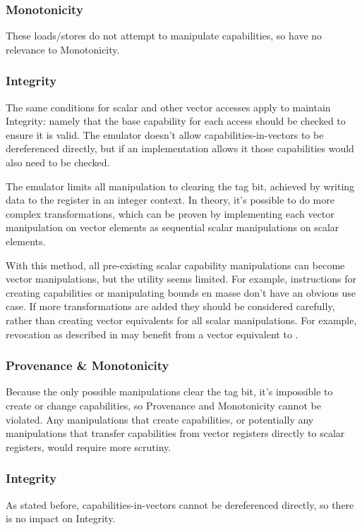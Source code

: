\subsubsection*{Monotonicity}
These loads/stores do not attempt to manipulate capabilities, so have no relevance to Monotonicity.

\subsubsection*{Integrity}
The same conditions for scalar and other vector accesses apply to maintain Integrity: namely that the base capability for each access should be checked to ensure it is valid.
The emulator doesn't allow capabilities-in-vectors to be dereferenced directly, but if an implementation allows it those capabilities would also need to be checked.

\pagebreak
{}
The emulator limits all manipulation to clearing the tag bit, achieved by writing data to the register in an integer context.
In theory, it's possible to do more complex transformations, which can be proven by implementing each vector manipulation on vector elements as sequential scalar manipulations on scalar elements.

With this method, all pre-existing scalar capability manipulations can become vector manipulations, but the utility seems limited.
For example, instructions for creating capabilities or manipulating bounds en masse don't have an obvious use case.
If more transformations are added they should be considered carefully, rather than creating vector equivalents for all scalar manipulations.
For example, revocation as described in \cite{xiaCHERIvokeCharacterisingPointer2019} may benefit from a vector equivalent to .

\subsubsection*{Provenance \& Monotonicity}
Because the only possible manipulations clear the tag bit, it's impossible to create or change capabilities, so Provenance and Monotonicity cannot be violated.
Any manipulations that create capabilities, or potentially any manipulations that transfer capabilities from vector registers directly to scalar registers, would require more scrutiny.

\subsubsection*{Integrity}
As stated before, capabilities-in-vectors cannot be dereferenced directly, so there is no impact on Integrity.
